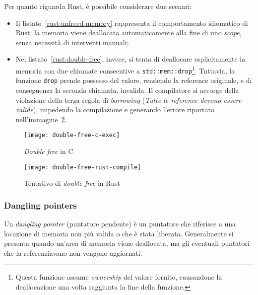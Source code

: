 Per quanto riguarda Rust, è possibile considerare due scenari: 
\begin{itemize}
    \item Il listato~\ref{rust:unfreed-memory} rappresenta il comportamento idiomatico di Rust: la memoria viene deallocata automaticamente alla fine di uno \textit{scope}, senza necessità di interventi manuali;
    \item Nel listato~\ref{rust:double-free}, invece, si tenta di deallocare esplicitamente la memoria con due chiamate consecutive a \texttt{std::mem::drop}\footnote{Questa funzione assume \textit{ownership} del valore fornito, causandone la deallocazione una volta raggiunta la fine della funzione.}. Tuttavia, la funzione \texttt{drop} prende possesso del valore, rendendo la reference originale, e di conseguenza la seconda chiamata, invalida. Il compilatore si accorge della violazione della terza regola di \textit{borrowing} (\textit{Tutte le reference devono essere valide}), impedendo la compilazione e generando l'errore riportato nell'immagine~\ref{rust:double-free-compile}.
\end{itemize}
\begin{figure}[htbp]
\begin{center}
    \texttt{[image: double-free-c-exec]}
    \caption{\textit{Double free} in C}\label{c:double-free-exec}
    \end{center}
\end{figure}
\begin{figure}[htbp]
\begin{center}
    \texttt{[image: double-free-rust-compile]}
    \caption{Tentativo di \textit{double free} in Rust}\label{rust:double-free-compile}
    \end{center}
\end{figure}

\subsubsection{Dangling pointers}
Un \textit{dangling pointer} (puntatore pendente) è un puntatore che riferisce a una locazione di memoria non più valida o che è stata liberata. 
Generalmente si presenta quando un'area di memoria viene deallocata, ma gli eventuali puntatori che la referenziavano non vengono aggiornati.

